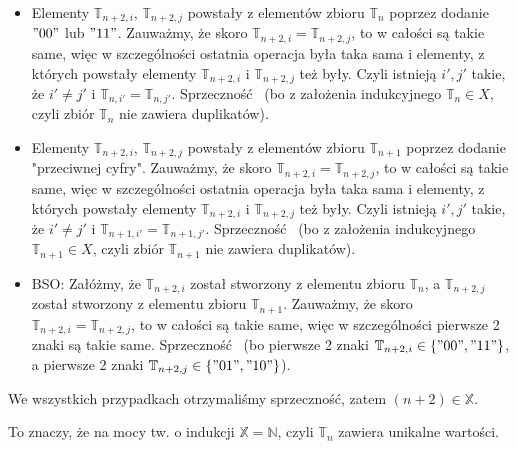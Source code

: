 \begin{itemize}
	\item Elementy $\mathbb{T}_{n + 2, i}$, $\mathbb{T}_{n + 2, j}$ powstały z elementów zbioru $\mathbb{T}_n$ poprzez dodanie $"00"$ lub $"11"$. Zauważmy, że skoro $\mathbb{T}_{n + 2, i} = \mathbb{T}_{n + 2, j}$, to w całości są takie same, więc w szczególności ostatnia operacja była taka sama i elementy, z których powstały elementy $\mathbb{T}_{n + 2, i}$ i $\mathbb{T}_{n + 2, j}$ też były. Czyli istnieją $i\prime, j\prime$ takie, że $i\prime \neq j\prime$ i $\mathbb{T}_{n, i\prime} = \mathbb{T}_{n, j\prime}$. Sprzeczność \lightning (bo z założenia indukcyjnego $\mathbb{T}_n \in X$, czyli zbiór $\mathbb{T}_n$ nie zawiera duplikatów).

	\item Elementy $\mathbb{T}_{n + 2, i}$, $\mathbb{T}_{n + 2, j}$ powstały z elementów zbioru $\mathbb{T}_{n + 1}$ poprzez dodanie "przeciwnej cyfry". Zauważmy, że skoro $\mathbb{T}_{n + 2, i} = \mathbb{T}_{n + 2, j}$, to w całości są takie same, więc w szczególności ostatnia operacja była taka sama i elementy, z których powstały elementy $\mathbb{T}_{n + 2, i}$ i $\mathbb{T}_{n + 2, j}$ też były. Czyli istnieją $i\prime, j\prime$ takie, że $i\prime \neq j\prime$ i $\mathbb{T}_{n + 1, i\prime} = \mathbb{T}_{n + 1, j\prime}$. Sprzeczność \lightning (bo z założenia indukcyjnego $\mathbb{T}_{n + 1} \in X$, czyli zbiór $\mathbb{T}_{n + 1}$ nie zawiera duplikatów).

	\item BSO: Załóżmy, że $\mathbb{T}_{n + 2, i}$ został stworzony z elementu zbioru $\mathbb{T}_n$, a $\mathbb{T}_{n + 2, j}$ został stworzony z elementu zbioru $\mathbb{T}_{n + 1}$. Zauważmy, że skoro $\mathbb{T}_{n + 2, i} = \mathbb{T}_{n + 2, j}$, to w całości są takie same, więc w szczególności pierwsze 2 znaki są takie same. Sprzeczność \lightning (bo pierwsze 2 znaki $\mathbb{T}_{n + 2, i} \in \{"00", "11"\}$, a  pierwsze 2 znaki $\mathbb{T}_{n + 2, j} \in \{"01", "10"\}$).
\end{itemize}

\noindent
We wszystkich przypadkach otrzymaliśmy sprzeczność, zatem $(n + 2) \in \mathbb{X}$.
\n

\noindent
To znaczy, że na mocy tw. o indukcji $\mathbb{X} = \mathbb{N}$, czyli $\mathbb{T}_n$ zawiera unikalne wartości.

